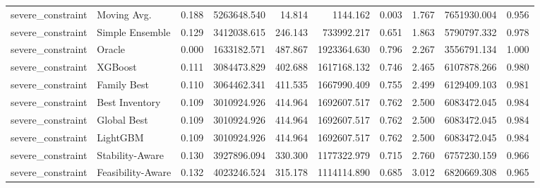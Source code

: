\begin{table}
{\begin{tabular}{llrrrrrrrr}
 severe\_constraint &        Moving Avg. & 0.188 &     5263648.540 &            14.814 &           1144.162 &           0.003 &                  1.767 &     7651930.004 &          0.956 \\
 severe\_constraint &    Simple Ensemble & 0.129 &     3412038.615 &           246.143 &         733992.217 &           0.651 &                  1.863 &     5790797.332 &          0.978 \\
 severe\_constraint &             Oracle & 0.000 &     1633182.571 &           487.867 &        1923364.630 &           0.796 &                  2.267 &     3556791.134 &          1.000 \\
 severe\_constraint &            XGBoost & 0.111 &     3084473.829 &           402.688 &        1617168.132 &           0.746 &                  2.465 &     6107878.266 &          0.980 \\
 severe\_constraint &        Family Best & 0.110 &     3064462.341 &           411.535 &        1667990.409 &           0.755 &                  2.499 &     6129409.103 &          0.981 \\
 severe\_constraint &     Best Inventory & 0.109 &     3010924.926 &           414.964 &        1692607.517 &           0.762 &                  2.500 &     6083472.045 &          0.984 \\
 severe\_constraint &        Global Best & 0.109 &     3010924.926 &           414.964 &        1692607.517 &           0.762 &                  2.500 &     6083472.045 &          0.984 \\
 severe\_constraint &           LightGBM & 0.109 &     3010924.926 &           414.964 &        1692607.517 &           0.762 &                  2.500 &     6083472.045 &          0.984 \\
 severe\_constraint &    Stability-Aware & 0.130 &     3927896.094 &           330.300 &        1177322.979 &           0.715 &                  2.760 &     6757230.159 &          0.966 \\
 severe\_constraint &  Feasibility-Aware & 0.132 &     4023246.524 &           315.178 &        1114114.890 &           0.685 &                  3.012 &     6820669.308 &          0.965 \\
\bottomrule
\end{tabular}
}

\end{table}
